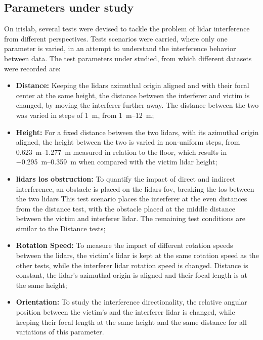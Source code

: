 \subsection{Parameters under study}
\label{subsec:lidar-interference:parameters-under-test}
On \ac{irislab}, several tests were devised to tackle the problem of \ac{lidar} interference from different perspectives. Tests scenarios were carried, where only one parameter is varied, in an attempt to understand the interference behavior between data. The test parameters under studied, from which different datasets were recorded are:

\begin{itemize}
	\item \textbf{Distance:} Keeping the \acp{lidar} azimuthal origin aligned and with their focal center at the same height, the distance between the interferer and victim is changed, by moving the interferer further away. The distance between the two was varied in steps of \SI{1}{\meter}, from \SIrange{1}{12}{\meter};
	\item \textbf{Height:} For a fixed distance between the two \acp{lidar}, with its azimuthal origin aligned, the height between the two is varied in non-uniform steps, from \SIrange{0.623}{1.277}{\meter} measured in relation to the floor, which results in \SIrange{-0.295}{0.359}{\meter} when compared with the victim \ac{lidar} height;
	\item \textbf{\acp{lidar} \ac{los} obstruction:} To quantify the impact of direct and indirect interference, an obstacle is placed on the \acp{lidar} \ac{fov}, breaking the \ac{los} between the two \acp{lidar} This test scenario places the interferer at the even distances from the distance test, with the obstacle placed at the middle distance between the victim and interferer \ac{lidar}. The remaining test conditions are similar to the Distance tests;
	\item \textbf{Rotation Speed:} To measure the impact of different rotation speeds between the \acp{lidar}, the victim's \ac{lidar} is kept at the same rotation speed as the other tests, while the interferer \ac{lidar} rotation speed is changed. Distance is constant, the \ac{lidar}'s azimuthal origin is aligned and their focal length is at the same height;
	\item \textbf{Orientation:} To study the interference directionality, the relative angular position between the victim's and the interferer \ac{lidar} is changed, while keeping their focal length at the same height and the same distance for all variations of this parameter.
\end{itemize}


